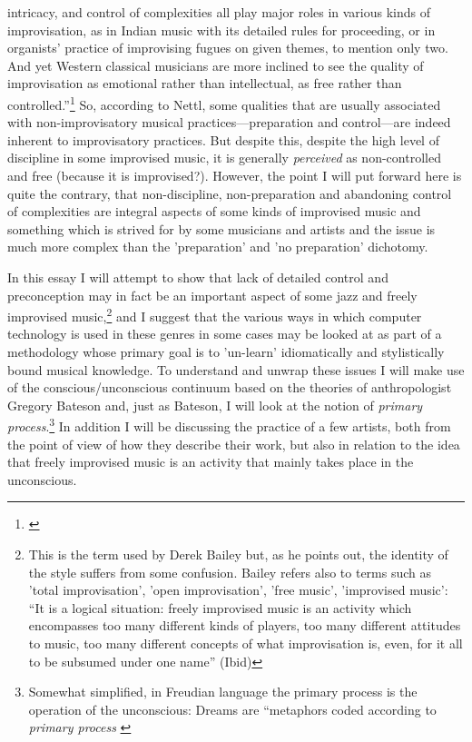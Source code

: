 intricacy, and control of complexities all play major roles in various
kinds of improvisation, as in Indian music with its detailed rules for
proceeding, or in organists' practice of improvising fugues on given
themes, to mention only two. And yet Western classical musicians are
more inclined to see the quality of improvisation as emotional rather
than intellectual, as free rather than
controlled.''\footnote{\citet[p. 10]{nettl98:2}} So, according to
Nettl, some qualities that are usually associated with
non-improvisatory musical practices---preparation and control---are
indeed inherent to improvisatory practices. But despite this, despite
the high level of discipline in some improvised music, it is generally \emph{perceived} as non-controlled and
free (because it is improvised?). However, the point I will put
forward here is quite the contrary, that non-discipline,
non-preparation and abandoning control of complexities are integral
aspects of some kinds of improvised music and something which is
strived for by some musicians and artists and the issue is much more
complex than the 'preparation' and 'no preparation' dichotomy. 

In this essay I will attempt to show that lack of detailed control and
preconception may in fact be an important aspect of some jazz and
freely improvised music,\footnote{This is the term used by Derek
  Bailey \citep[p. 83]{bailey92} but, as he points out, the identity
  of the style suffers from some confusion. Bailey refers also to
  terms such as 'total improvisation', 'open improvisation', 'free
  music', 'improvised music': ``It is a logical situation: freely
  improvised music is an activity which encompasses too many different
  kinds of players, too many different attitudes to music, too many
  different concepts of what improvisation is, even, for it all to be
  subsumed under one name'' (Ibid)} and I suggest that the various
ways in which computer technology is used in these genres in some
cases may be looked at as part of a methodology whose primary goal is
to 'un-learn' idiomatically and stylistically bound musical
knowledge. To understand and unwrap these issues I will make use of
the conscious/unconscious continuum based on the theories of
anthropologist Gregory Bateson and, just as Bateson, I will look at
the notion of \emph{primary process}.\footnote{Somewhat simplified, in
  Freudian language the primary process is the operation of the
  unconscious: Dreams are ``metaphors coded according to \emph{primary
    process} \citep[p. 135]{bateson72}} In addition I will be
discussing the practice of a few artists, both from the point of view
of how they describe their work, but also in relation to the idea that
freely improvised music is an activity that mainly takes place in the
unconscious.

